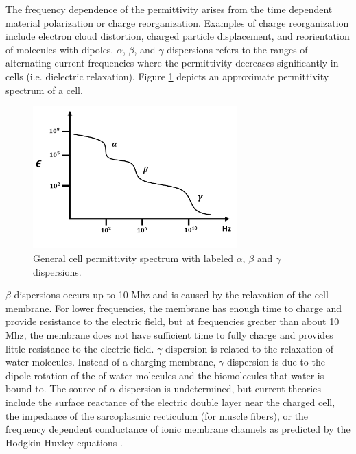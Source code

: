  \par The frequency dependence of the permittivity arises from the time dependent material polarization or charge reorganization. Examples of charge reorganization include electron cloud distortion, charged particle displacement, and reorientation of molecules with dipoles. $\alpha$, $\beta$, and $\gamma$ dispersions refers to the ranges of alternating current frequencies where the permittivity decreases significantly in cells (i.e. dielectric relaxation). Figure \ref{fig:schwan_dispersions} depicts an approximate permittivity spectrum of a cell.
 
 \begin{figure}[ht]
 \centering
 \includegraphics[width=0.7\textwidth]{images/schwanDispersions.png}
 \caption[General cell permittivity spectrum]{General cell permittivity spectrum with labeled $\alpha$, $\beta$ and $\gamma$ dispersions.}
 \label{fig:schwan_dispersions}
 \end{figure}
 
 \par $\beta$ dispersions occurs up to 10 Mhz and is caused by the relaxation of the cell membrane. For lower frequencies, the membrane has enough time to charge and provide resistance to the electric field, but at frequencies greater than about 10 Mhz, the membrane does not have sufficient time to fully charge and provides little resistance to the electric field. $\gamma$ dispersion is related to the relaxation of water molecules. Instead of a charging membrane, $\gamma$ dispersion is due to the dipole rotation of the of water molecules and the biomolecules that water is bound to. The source of $\alpha$ dispersion is undetermined, but current theories include the surface reactance of the electric double layer near the charged cell, the impedance of the sarcoplasmic recticulum (for muscle fibers), or the frequency dependent conductance of ionic membrane channels as predicted by the Hodgkin-Huxley equations \cite{schwan_electrical_1994}.
 
